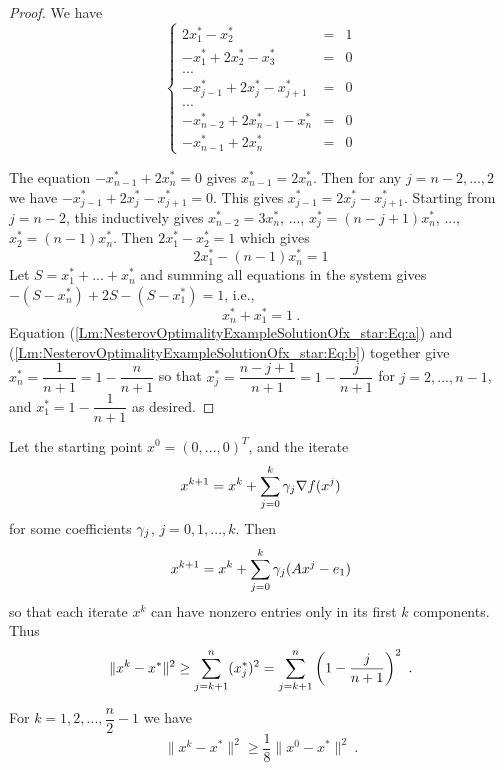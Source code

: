\begin{proof}
We have 
$$\left\{\begin{array}{lcl}
2x^*_1-x^*_2 & = & 1
\\
-x^*_1+2x^*_2-x^*_3 & = & 0
\\
...
\\
-x^*_{j-1}+2x^*_j-x^*_{j+1} & = & 0
\\
...
\\
-x^*_{n-2}+2x^*_{n-1}-x^*_n & = & 0
\\
-x^*_{n-1}+2x^*_n & = & 0 
\end{array}\right.$$ 

The equation $-x^*_{n-1}+2x^*_n=0$ gives $x^*_{n-1}=2x^*_n$. Then for any $j=n-2,...,2$ we have $-x^*_{j-1}+2x^*_j-x^*_{j+1}=0$. This gives $x^*_{j-1}=2x^*_j-x^*_{j+1}$. Starting from $j=n-2$, this inductively gives $x^*_{n-2}=3x^*_n$, ..., $x^*_j=(n-j+1)x^*_n$, ..., $x^*_2=(n-1)x^*_n$. Then $2x^*_1-x^*_2=1$ which gives 
\begin{equation}\label{Lm:NesterovOptimalityExampleSolutionOfx_star:Eq:a}
2x^*_1-(n-1)x^*_n=1
\end{equation}
Let $S=x^*_1+...+x^*_n$ and summing all equations in the system gives $-(S-x^*_n)+2S-(S-x^*_1)=1$, i.e., 
\begin{equation}\label{Lm:NesterovOptimalityExampleSolutionOfx_star:Eq:b}
x^*_n+x^*_1=1 \ .
\end{equation}
Equation (\ref{Lm:NesterovOptimalityExampleSolutionOfx_star:Eq:a}) and (\ref{Lm:NesterovOptimalityExampleSolutionOfx_star:Eq:b}) together give $x^*_n=\dfrac{1}{n+1}=1-\dfrac{n}{n+1}$ so that $x^*_j=\dfrac{n-j+1}{n+1}=1-\dfrac{j}{n+1}$ for $j=2,...,n-1$, and $x^*_1=1-\dfrac{1}{n+1}$ as desired.
\end{proof}

Let the starting point $x^0=(0,...,0)^T$, and the iterate
$$x^{k+1}=x^k+\sum\limits_{j=0}^k \gamma_j \nabla f(x^j)$$
for some coefficients $\gamma_j$, $j=0,1,...,k$. Then 
$$x^{k+1}=x^k+\sum\limits_{j=0}^k \gamma_j (Ax^j-e_1) $$
so that each iterate $x^k$ can have nonzero entries only in its first $k$ components. Thus
$$\|x^k-x^*\|^2\geq \sum\limits_{j=k+1}^n (x_j^*)^2=\sum\limits_{j=k+1}^n \left(1-\dfrac{j}{n+1}\right)^2 \ .$$

\begin{lemma}\label{Lm:NesterovOptimalityExampleAuxiliaryBoundx_star}
For $k=1,2,...,\dfrac{n}{2}-1$ we have
\begin{equation}\label{Lm:NesterovOptimalityExampleAuxiliaryBoundx_star:Eq}
\|x^k-x^*\|^2\geq \dfrac{1}{8}\|x^0-x^*\|^2 \ .
\end{equation}
\end{lemma}

